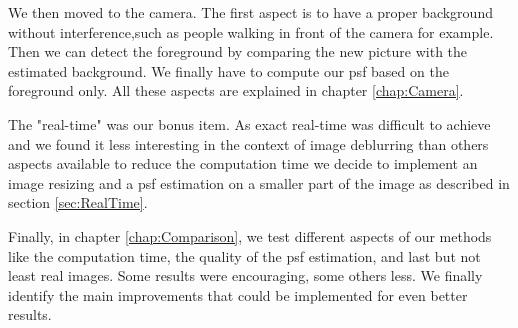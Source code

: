 We then moved to the camera. The first aspect is to have a proper background without interference,such as  people walking in front of the camera for example. Then we can detect the foreground by comparing the new picture with the estimated background. We finally have to compute our psf based on the foreground only. All these aspects are explained in chapter \ref{chap:Camera}. 

The "real-time" was our bonus item. As exact real-time was difficult to achieve and we found it less interesting in the context of image deblurring than others aspects available to reduce the computation time we decide to implement an image resizing and a psf estimation on a smaller part of the image as described in section \ref{sec:RealTime}. 

Finally, in chapter \ref{chap:Comparison}, we test different aspects of our methods like the computation time, the quality of the psf estimation, and last but not least real images.  Some results were encouraging, some others less. We finally identify the main improvements that could be implemented for even better results.

 
